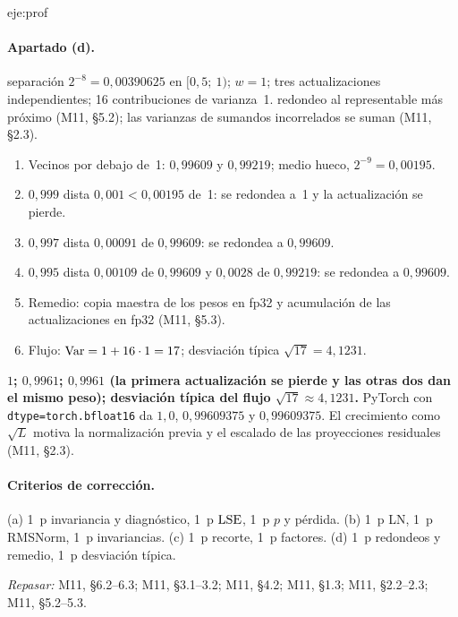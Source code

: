 \begin{solucion}{eje:prof}
\paragraph{Apartado (d).}
\datos separación $2^{-8}=0{,}00390625$ en $[0{,}5;\allowbreak\ 1)$; $w=1$; tres actualizaciones independientes; 16 contribuciones de varianza~1.
\planteamiento redondeo al representable más próximo (M11, §5.2); las varianzas de sumandos incorrelados se suman (M11, §2.3).
\pasos
\begin{enumerate}[label=\arabic*.]
  \item Vecinos por debajo de~1: $0{,}99609$ y $0{,}99219$; medio hueco, $2^{-9}=0{,}00195$.
  \item $0{,}999$ dista $0{,}001<0{,}00195$ de~1: se redondea a~1 y la actualización se pierde.
  \item $0{,}997$ dista $0{,}00091$ de $0{,}99609$: se redondea a $0{,}99609$.
  \item $0{,}995$ dista $0{,}00109$ de $0{,}99609$ y $0{,}0028$ de $0{,}99219$: se redondea a $0{,}99609$.
  \item Remedio: copia maestra de los pesos en fp32 y acumulación de las actualizaciones en fp32 (M11, §5.3).
  \item Flujo: $\operatorname{Var}=1+16\cdot 1=17$; desviación típica $\sqrt{17}=4{,}1231$.
\end{enumerate}
\resultado \textbf{$1$; $0{,}9961$; $0{,}9961$ (la primera actualización se pierde y las otras dos dan el mismo peso); desviación típica del flujo $\sqrt{17}\approx 4{,}1231$.}
\comprobacion PyTorch con \texttt{dtype=torch.bfloat16} da $1{,}0$, $0{,}99609375$ y $0{,}99609375$. El crecimiento como $\sqrt L$ motiva la normalización previa y el escalado de las proyecciones residuales (M11, §2.3).

\paragraph{Criterios de corrección.} (a) 1~p invariancia y diagnóstico, 1~p $\operatorname{LSE}$, 1~p $p$ y pérdida. (b) 1~p LN, 1~p RMSNorm, 1~p invariancias. (c) 1~p recorte, 1~p factores. (d) 1~p redondeos y remedio, 1~p desviación típica.

\textit{Repasar:} M11, §6.2--6.3; M11, §3.1--3.2; M11, §4.2; M11, §1.3; M11, §2.2--2.3; M11, §5.2--5.3.
\end{solucion}

